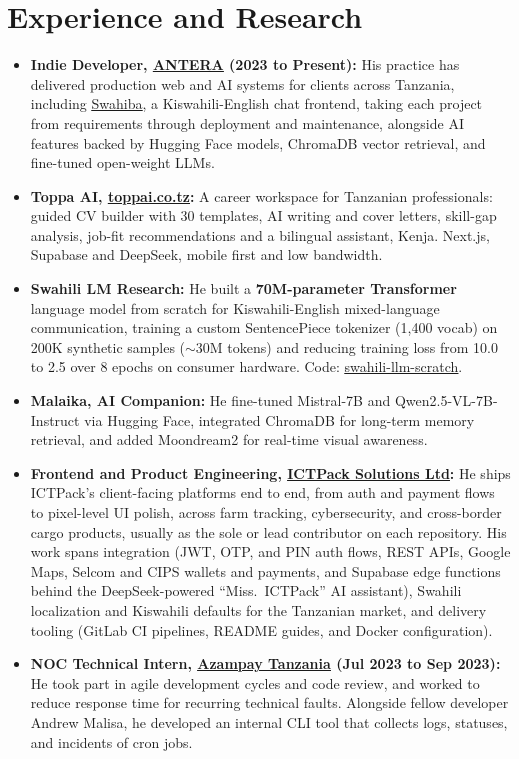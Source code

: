 \documentclass[12pt]{article}
\newcommand{\hlink}[2]{\href{#1}{\textcolor{linkblue}{\underline{#2}}}}
\begin{document}
\section*{Experience and Research}
\begin{itemize}
    \item \textbf{Indie Developer, \hlink{https://antera.co.tz}{ANTERA} (2023 to Present):} His practice has delivered production web and AI systems for clients across Tanzania, including \hlink{https://swahiba.vercel.app}{Swahiba}, a Kiswahili-English chat frontend, taking each project from requirements through deployment and maintenance, alongside AI features backed by Hugging Face models, ChromaDB vector retrieval, and fine-tuned open-weight LLMs.
    \item \textbf{Toppa AI, \hlink{https://toppai.co.tz}{toppai.co.tz}:} A career workspace for Tanzanian professionals: guided CV builder with 30 templates, AI writing and cover letters, skill-gap analysis, job-fit recommendations and a bilingual assistant, Kenja. Next.js, Supabase and DeepSeek, mobile first and low bandwidth.
    \item \textbf{Swahili LM Research:} He built a \textbf{70M-parameter Transformer} language model from scratch for Kiswahili-English mixed-language communication, training a custom SentencePiece tokenizer (1,400 vocab) on 200K synthetic samples ($\sim$30M tokens) and reducing training loss from 10.0 to 2.5 over 8 epochs on consumer hardware. Code: \hlink{https://github.com/zuck30/swahili-llm-scratch}{swahili-llm-scratch}.
    \item \textbf{Malaika, AI Companion:} He fine-tuned Mistral-7B and Qwen2.5-VL-7B-Instruct via Hugging Face, integrated ChromaDB for long-term memory retrieval, and added Moondream2 for real-time visual awareness.
    \item \textbf{Frontend and Product Engineering, \hlink{https://ictpack.com}{ICTPack Solutions Ltd}:} He ships ICTPack's client-facing platforms end to end, from auth and payment flows to pixel-level UI polish, across farm tracking, cybersecurity, and cross-border cargo products, usually as the sole or lead contributor on each repository. His work spans integration (JWT, OTP, and PIN auth flows, REST APIs, Google Maps, Selcom and CIPS wallets and payments, and Supabase edge functions behind the DeepSeek-powered ``Miss.\ ICTPack'' AI assistant), Swahili localization and Kiswahili defaults for the Tanzanian market, and delivery tooling (GitLab CI pipelines, README guides, and Docker configuration).
    \item \textbf{NOC Technical Intern, \hlink{https://azampay.com/}{Azampay Tanzania} (Jul 2023 to Sep 2023):} He took part in agile development cycles and code review, and worked to reduce response time for recurring technical faults. Alongside fellow developer Andrew Malisa, he developed an internal CLI tool that collects logs, statuses, and incidents of cron jobs.
\end{itemize}
\end{document}
